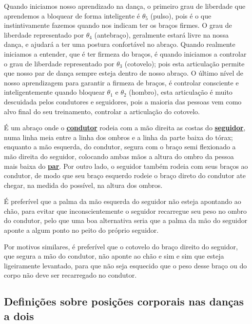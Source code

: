 Quando iniciamos nosso aprendizado na dança, 
o primeiro grau de liberdade que aprendemos a bloquear de forma inteligente é $\theta_5$ (pulso),
pois é o que instintivamente fazemos quando nos indicam ter os braços firmes.
O grau de liberdade representado por $\theta_4$ (antebraço), geralmente estará livre na nossa dança,
e ajudará a ter uma postura confortável no abraço.
Quando realmente iniciamos a entender, que é ter firmeza do braços,
é quando iniciamos a controlar o grau de liberdade representado por $\theta_3$ (cotovelo);
pois esta articulação permite que nosso par de dança sempre esteja dentro de nosso abraço.
O último nível de nosso aprendizagem para garantir a firmeza de braços,
é controlar consciente e inteligentemente quando bloquear  $\theta_1$ e $\theta_2$ (hombro),
esta articulação é muito descuidada pelos condutores e seguidores,
pois a maioria das pessoas vem como alvo final do seu treinamento,
controlar a articulação do cotovelo. 

\begin{definition}
\label{def:abracodedanca}  
É um abraço onde o \hyperref[def:Condutor]{\textbf{condutor}} 
rodeia com a mão direita as costas do \hyperref[def:Seguidor]{\textbf{seguidor}},
numa linha meia entre a linha dos ombros e a linha da parte baixa do tórax;
enquanto a mão esquerda, do condutor, segura com o braço semi flexionado a mão direita do seguidor,
colocando ambas mãos a altura do ombro da pessoa mais baixa do \hyperref[def:Par]{\textbf{par}}.
Por outro lado, o seguidor também rodeia com seus braços ao condutor,
de modo que seu braço esquerdo rodeie o braço direto do condutor ate chegar,
na medida do possível, na altura dos ombros. 

É preferível que a palma da mão esquerda do seguidor não esteja apontando ao chão,
para evitar que inconscientemente o seguidor recarregue seu peso no ombro do condutor,
pelo que uma boa alternativa seria que a palma da mão do seguidor aponte a algum ponto no peito do próprio seguidor.

Por motivos similares, é preferível que o cotovelo do braço direito do seguidor,
que segura a mão do condutor,
não aponte ao chão e sim e sim que esteja ligeiramente levantado,
para que não seja esquecido que o peso desse braço ou do corpo não deve ser recarregado no condutor. 
\end{definition}

\subsection{Definições sobre posições corporais  nas danças a dois}

